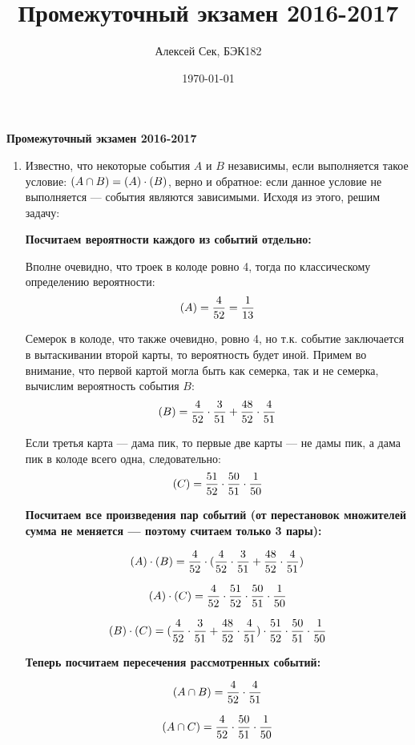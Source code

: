 \documentclass[a4paper]{article} %
\title{Промежуточный экзамен 2016-2017}
\author{Алексей Сек, БЭК182}
\date{\today}
\let\P\relax
\DeclareMathOperator{\P}{\mathbb{P}}
\begin{document}
\maketitle

\textbf{Промежуточный экзамен 2016-2017}

\begin{enumerate}

    \item
    Известно, что некоторые события $A$ и $B$ независимы, если выполняется такое условие:
    $ \P(A \cap B) = \P(A) \cdot \P(B) $, верно и обратное: если данное условие не выполняется — события являются зависимыми. Исходя из этого, решим задачу:
    
    \textbf{Посчитаем вероятности каждого из событий отдельно:}
    
    Вполне очевидно, что троек в колоде ровно 4, тогда по классическому определению вероятности:
    \[ 
    \P(A) = \frac{4}{52} = \frac{1}{13} 
    \]
    
    Семерок в колоде, что также очевидно, ровно 4, но т.к. событие заключается в вытаскивании второй карты, то вероятность будет иной.
    Примем во внимание, что первой картой могла быть как семерка, так и не семерка, вычислим вероятность события $B$: 
    \[
    \P(B) = \frac{4}{52}\cdot\frac{3}{51} + \frac{48}{52}\cdot\frac{4}{51} 
    \]
    
    Если третья карта — дама пик, то первые две карты — не дамы пик, а дама пик в колоде всего одна, следовательно:
    \[ 
    \P(C) = \frac{51}{52}\cdot\frac{50}{51}\cdot\frac{1}{50} 
    \]
    
    \textbf{Посчитаем все произведения пар событий (от перестановок множителей сумма не меняется — поэтому считаем только 3 пары):}
    
    \[
    \P(A) \cdot \P(B) = \frac{4}{52}\cdot(\frac{4}{52}\cdot\frac{3}{51} + \frac{48}{52}\cdot\frac{4}{51}) 
    \]
    
    \[
     \P(A) \cdot \P(C) = \frac{4}{52}\cdot\frac{51}{52}\cdot\frac{50}{51}\cdot\frac{1}{50} 
    \]
    
    \[
     \P(B) \cdot \P(C) = (\frac{4}{52}\cdot\frac{3}{51} + \frac{48}{52}\cdot\frac{4}{51})\cdot\frac{51}{52}\cdot\frac{50}{51}\cdot\frac{1}{50}
    \]
    
    \textbf{Теперь посчитаем пересечения рассмотренных событий:}
    
    \[
    \P(A \cap B) = \frac{4}{52}\cdot\frac{4}{51}
    \]
    
    \[
    \P(A \cap C) = \frac{4}{52}\cdot\frac{50}{51}\cdot\frac{1}{50} 
    \]
    

\end{enumerate}
\end{document}

